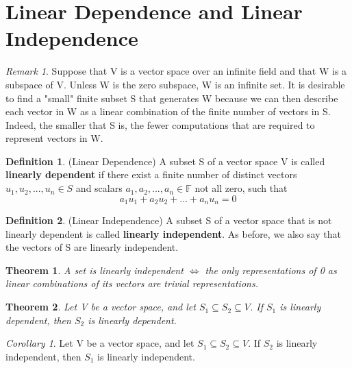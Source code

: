 \documentclass[12pt]{article}
\newtheorem{theorem}{Theorem}[section]
\theoremstyle{definition}
\newtheorem{definition}{Definition}[section]
\theoremstyle{remark}
\newtheorem*{remark}{Remark}
\newtheorem{corollary}{Corollary}[theorem]
\begin{document}
\section{Linear Dependence and Linear Independence}
    \begin{remark}
        Suppose that V is a vector space over an infinite field and that W is a subspace of V. 
        Unless W is the zero subspace, W is an infinite set. It is desirable to find a "small" 
        finite subset S that generates W because we can then describe each vector in W as a linear 
        combination of the finite number of vectors in S. Indeed, the smaller that S is, 
        the fewer computations that are required to represent vectors in W. 
    \end{remark}
    \begin{definition}(Linear Dependence)
        A subset S of a vector space V is called \textbf{linearly dependent} if there exist a finite 
        number of distinct vectors $u_1, u_2 ,...,u_n \in S$ and scalars $a_1,a_2,...,a_n \in \mathbb{F}$
        not all zero, such that
        \begin{equation*}
            a_1u_1+a_2u_2+...+a_nu_n=0
        \end{equation*}
    \end{definition}

    \begin{definition}(Linear Independence)
        A subset S of a vector space that is not linearly dependent is called \textbf{linearly independent}. 
        As before, we also say that the vectors of S are linearly independent.
    \end{definition}

    \begin{theorem}
        A set is linearly independent $\iff$ the only representations of 0 as linear combinations of 
        its vectors are trivial representations.
    \end{theorem}

    \begin{theorem}
        Let V be a vector space, and let $S_1 \subseteq S_2 \subseteq V$. If $S_1$ is linearly dependent, 
        then $S_2$ is linearly dependent.
    \end{theorem}

    \begin{corollary}
        Let V be a vector space, and let $S_1 \subseteq S_2 \subseteq V$. If $S_2$ is linearly independent, 
        then $S_1$ is linearly independent.
    \end{corollary}
\end{document}

